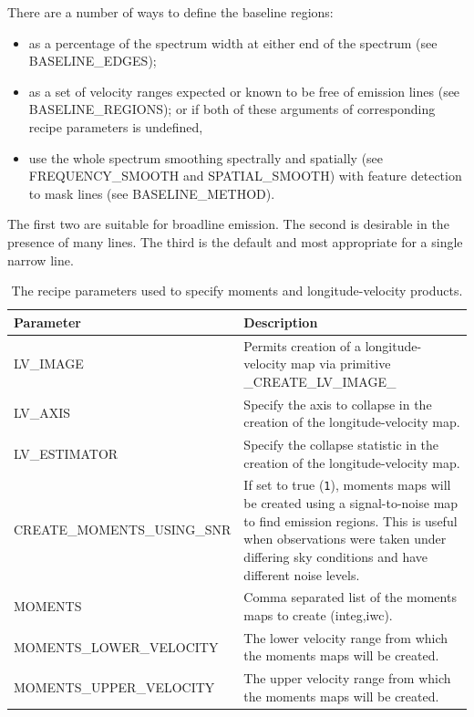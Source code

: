\documentclass[11pt,oneside,chapters]{starlink}
\begin{document}
There are a number of ways to define the baseline regions:
\begin{itemize}
\item as a percentage of the spectrum width at either end of the spectrum
      (see BASELINE\_EDGES);
\item as a set of velocity ranges expected or known to be free of emission
      lines (see BASELINE\_REGIONS); or if both of these arguments of
      corresponding recipe parameters is undefined,
\item use the whole spectrum smoothing spectrally and spatially (see
      FREQUENCY\_SMOOTH and SPATIAL\_SMOOTH) with feature detection to mask
      lines (see BASELINE\_METHOD).
\end{itemize}
The first two are suitable for broadline emission.  The second is
desirable in the presence of many lines.  The third is the default and
most appropriate for a single narrow line.
\bigskip

\begin{table}[h!]
\begin{small}
\begin{tabular}{|p{7.5cm}|p{8cm}|}
\hline
\textbf{Parameter} & \textbf{Description} \\
\hline
LV\_IMAGE & Permits creation of a longitude-velocity map via primitive \_CREATE\_LV\_IMAGE\_\\
LV\_AXIS & Specify the axis to collapse in the creation of the longitude-velocity map.\\
LV\_ESTIMATOR & Specify the collapse statistic in the creation of the longitude-velocity map.\\
\hline
CREATE\_MOMENTS\_USING\_SNR & If set to true (\texttt{1}), moments maps will be created using a
                              signal-to-noise map to find emission regions. This is useful
                              when observations were taken under differing sky conditions
                              and have different noise levels.\\
\hline
MOMENTS & Comma separated list of the moments maps to create (integ,iwc).\\

MOMENTS\_LOWER\_VELOCITY & The lower velocity range from which the moments maps will be
                           created.\\
MOMENTS\_UPPER\_VELOCITY & The upper velocity range from which the moments maps will be
                           created.\\
\hline
\hline
\end{tabular}
\end{small}
\caption{\label{tab:moments_params}
  The recipe parameters used to specify moments and longitude-velocity products.}
\end{table}
\end{document}
